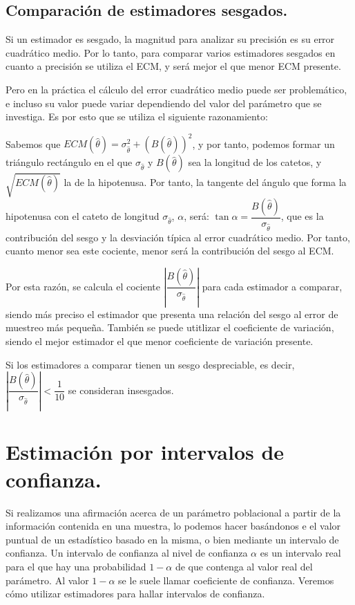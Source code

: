 \subsection{Comparaci\'on de estimadores sesgados.}

Si un estimador es sesgado, la magnitud para analizar su precisi\'on
es su error cuadr\'atico medio. Por lo tanto, para comparar varios estimadores
sesgados en cuanto a precisi\'on se utiliza el ECM, y ser\'a mejor el
que menor ECM presente.

Pero en la pr\'actica el c\'alculo del error cuadr\'atico medio puede ser
problem\'atico, e incluso su valor puede variar dependiendo del valor
del par\'ametro que se investiga. Es por esto que se utiliza el siguiente
razonamiento:

Sabemos que $ECM\left(\hat{\theta}\right)=\sigma_{\hat{\theta}}^{2}+\left(B\left(\hat{\theta}\right)\right)^{2}$,
y por tanto, podemos formar un tri\'angulo rect\'angulo en el que $\sigma_{\hat{\theta}}$
y $B\left(\hat{\theta}\right)$ sea la longitud de los catetos, y
$\sqrt{ECM\left(\hat{\theta}\right)}$ la de la hipotenusa. Por tanto,
la tangente del \'angulo que forma la hipotenusa con el cateto de longitud
$\sigma_{\hat{\theta}}$, $\alpha$, ser\'a: $\tan\alpha=\dfrac{B\left(\hat{\theta}\right)}{\sigma_{\hat{\theta}}}$,
que es la contribuci\'on del sesgo y la desviaci\'on t\'ipica al error cuadr\'atico
medio. Por tanto, cuanto menor sea este cociente, menor ser\'a la contribuci\'on
del sesgo al ECM.

Por esta raz\'on, se calcula el cociente $\left|\dfrac{B\left(\hat{\theta}\right)}{\sigma_{\hat{\theta}}}\right|$
para cada estimador a comparar, siendo m\'as preciso el estimador que
presenta una relaci\'on del sesgo al error de muestreo m\'as peque\~na.
Tambi\'en se puede utitlizar el coeficiente de variaci\'on, siendo el
mejor estimador el que menor coeficiente de variaci\'on presente.

Si los estimadores a comparar tienen un sesgo despreciable, es decir,$\left|\dfrac{B\left(\hat{\theta}\right)}{\sigma_{\hat{\theta}}}\right|<\dfrac{1}{10}$
se consideran insesgados.


\section{Estimaci\'on por intervalos de confianza.}

Si realizamos una afirmaci\'on acerca de un par\'ametro poblacional a
partir de la informaci\'on contenida en una muestra, lo podemos hacer
bas\'andonos e el valor puntual de un estad\'istico basado en la misma,
o bien mediante un intervalo de confianza. Un intervalo de confianza
al nivel de confianza $\alpha$ es un intervalo real para el que hay
una probabilidad $1-\alpha$ de que contenga al valor real del par\'ametro.
Al valor $1-\alpha$ se le suele llamar coeficiente de confianza.
Veremos c\'omo utilizar estimadores para hallar intervalos de confianza.


